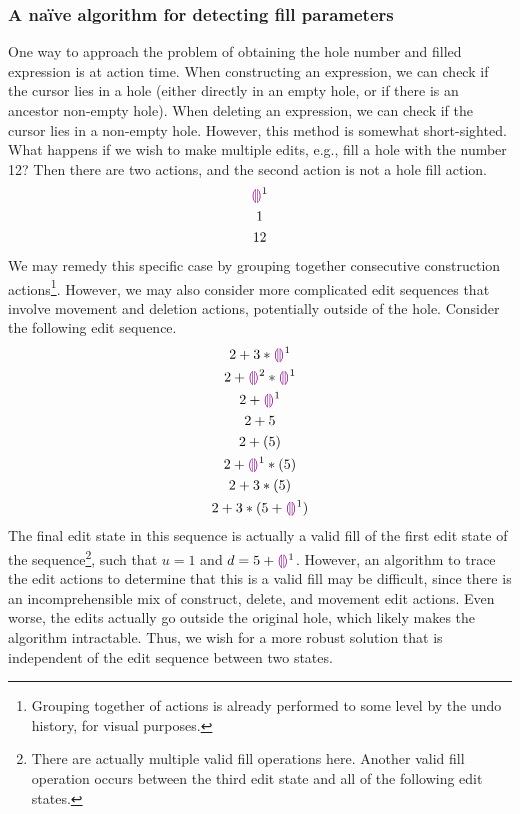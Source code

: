 \subsubsection{A na\"ive algorithm for detecting fill parameters}
\label{sec:far-detect-naive}

One way to approach the problem of obtaining the hole number and filled expression is at action time. When constructing an expression, we can check if the cursor lies in a hole (either directly in an empty hole, or if there is an ancestor non-empty hole). When deleting an expression, we can check if the cursor lies in a non-empty hole. However, this method is somewhat short-sighted. What happens if we wish to make multiple edits, e.g., fill a hole with the number 12? Then there are two actions, and the second action is not a hole fill action.
\begin{gather*}
  \textcolor{violet}{\llparenthesis}\textcolor{violet}{\rrparenthesis}^1 \\
  1 \\
  12
\end{gather*}
We may remedy this specific case by grouping together consecutive construction actions\footnote{Grouping together of actions is already performed to some level by the undo history, for visual purposes.}. However, we may also consider more complicated edit sequences that involve movement and deletion actions, potentially outside of the hole. Consider the following edit sequence.
\begin{gather*}
  2+3*\textcolor{violet}{\llparenthesis}\textcolor{violet}{\rrparenthesis}^1 \\
  2+\textcolor{violet}{\llparenthesis}\textcolor{violet}{\rrparenthesis}^2*\textcolor{violet}{\llparenthesis}\textcolor{violet}{\rrparenthesis}^1\\
  2+\textcolor{violet}{\llparenthesis}\textcolor{violet}{\rrparenthesis}^1\\
  2+5 \\
  2+(5) \\
  2+\textcolor{violet}{\llparenthesis}\textcolor{violet}{\rrparenthesis}^1*(5) \\
  2+3*(5) \\
  2+3*(5+\textcolor{violet}{\llparenthesis}\textcolor{violet}{\rrparenthesis}^1)
\end{gather*}
The final edit state in this sequence is actually a valid fill of the first edit state of the sequence\footnote{There are actually multiple valid fill operations here. Another valid fill operation occurs between the third edit state and all of the following edit states.}, such that $u=1$ and $d=5+\textcolor{violet}{\llparenthesis}\textcolor{violet}{\rrparenthesis}^1$. However, an algorithm to trace the edit actions to determine that this is a valid fill may be difficult, since there is an incomprehensible mix of construct, delete, and movement edit actions. Even worse, the edits actually go outside the original hole, which likely makes the algorithm intractable. Thus, we wish for a more robust solution that is independent of the edit sequence between two states.


